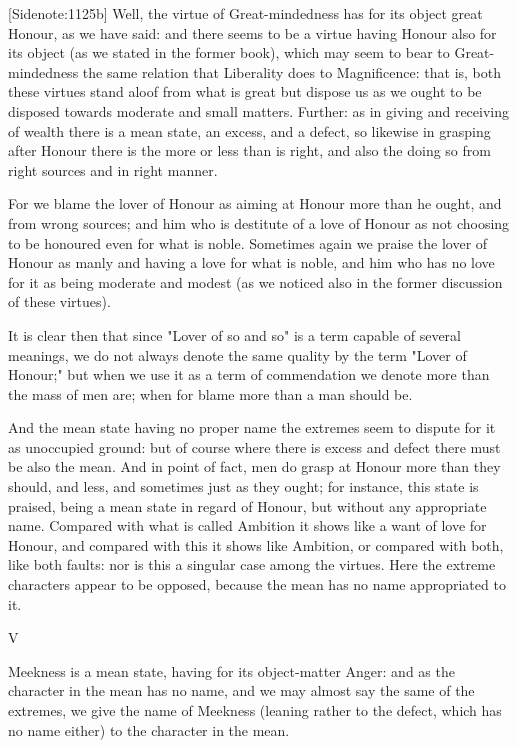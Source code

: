 [Sidenote:1125b] Well, the virtue of Great-mindedness has for its object
great Honour, as we have said: and there seems to be a virtue having
Honour also for its object (as we stated in the former book), which may
seem to bear to Great-mindedness the same relation that Liberality does
to Magnificence: that is, both these virtues stand aloof from what is
great but dispose us as we ought to be disposed towards moderate and
small matters. Further: as in giving and receiving of wealth there is
a mean state, an excess, and a defect, so likewise in grasping after
Honour there is the more or less than is right, and also the doing so
from right sources and in right manner.

For we blame the lover of Honour as aiming at Honour more than he ought,
and from wrong sources; and him who is destitute of a love of Honour as
not choosing to be honoured even for what is noble. Sometimes again we
praise the lover of Honour as manly and having a love for what is noble,
and him who has no love for it as being moderate and modest (as we
noticed also in the former discussion of these virtues).

It is clear then that since "Lover of so and so" is a term capable of
several meanings, we do not always denote the same quality by the term
"Lover of Honour;" but when we use it as a term of commendation we
denote more than the mass of men are; when for blame more than a man
should be.

And the mean state having no proper name the extremes seem to dispute
for it as unoccupied ground: but of course where there is excess and
defect there must be also the mean. And in point of fact, men do grasp
at Honour more than they should, and less, and sometimes just as they
ought; for instance, this state is praised, being a mean state in regard
of Honour, but without any appropriate name. Compared with what is
called Ambition it shows like a want of love for Honour, and compared
with this it shows like Ambition, or compared with both, like both
faults: nor is this a singular case among the virtues. Here the
extreme characters appear to be opposed, because the mean has no name
appropriated to it.


V

Meekness is a mean state, having for its object-matter Anger: and as the
character in the mean has no name, and we may almost say the same of the
extremes, we give the name of Meekness (leaning rather to the defect,
which has no name either) to the character in the mean.

